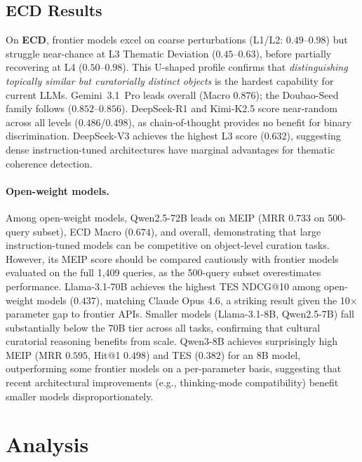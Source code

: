 \documentclass[11pt]{article}
\begin{document}
\subsection{ECD Results}

On \textbf{ECD}, frontier models excel on coarse perturbations (L1/L2:
$0.49$--$0.98$) but struggle near-chance at L3 Thematic Deviation
($0.45$--$0.63$), before partially recovering at L4 ($0.50$--$0.98$).
This U-shaped profile confirms that \emph{distinguishing topically similar
but curatorially distinct objects} is the hardest capability for current LLMs.
Gemini~3.1~Pro leads overall (Macro $0.876$); the Doubao-Seed family
follows ($0.852$--$0.856$).
DeepSeek-R1 and Kimi-K2.5 score near-random across all levels ($0.486$/$0.498$),
as chain-of-thought provides no benefit for binary discrimination.
DeepSeek-V3 achieves the highest L3 score ($0.632$),
suggesting dense instruction-tuned architectures have marginal advantages
for thematic coherence detection.

\paragraph{Open-weight models.}
Among open-weight models, Qwen2.5-72B leads on MEIP (MRR $0.733$ on 500-query subset),
ECD Macro ($0.674$), and overall, demonstrating that large instruction-tuned models can
be competitive on object-level curation tasks.
However, its MEIP score should be compared cautiously with frontier models evaluated
on the full 1{,}409 queries, as the 500-query subset overestimates performance.
Llama-3.1-70B achieves the highest TES NDCG@10 among open-weight models ($0.437$),
matching Claude Opus 4.6, a striking result given the 10$\times$ parameter gap to frontier APIs.
Smaller models (Llama-3.1-8B, Qwen2.5-7B) fall substantially below the 70B tier across all tasks,
confirming that cultural curatorial reasoning benefits from scale.
Qwen3-8B achieves surprisingly high MEIP (MRR $0.595$, Hit@1 $0.498$) and TES ($0.382$)
for an 8B model, outperforming some frontier models on a per-parameter basis,
suggesting that recent architectural improvements (e.g., thinking-mode compatibility)
benefit smaller models disproportionately.

\section{Analysis}
\label{sec:analysis}
\end{document}
